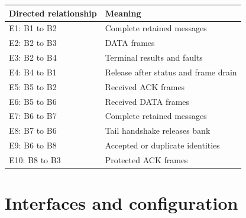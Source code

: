 \documentclass[11pt,a4paper]{article}
\begin{document}
{\small\begin{longtable}{@{}L{0.24\textwidth}L{0.7\textwidth}@{}}\toprule

\textbf{Directed relationship} & \textbf{Meaning}\\\midrule\endhead

E1: B1 to B2 & Complete retained messages\\[3pt]

E2: B2 to B3 & DATA frames\\[3pt]

E3: B2 to B4 & Terminal results and faults\\[3pt]

E4: B4 to B1 & Release after status and frame drain\\[3pt]

E5: B5 to B2 & Received ACK frames\\[3pt]

E6: B5 to B6 & Received DATA frames\\[3pt]

E7: B6 to B7 & Complete retained messages\\[3pt]

E8: B7 to B6 & Tail handshake releases bank\\[3pt]

E9: B6 to B8 & Accepted or duplicate identities\\[3pt]

E10: B8 to B3 & Protected ACK frames\\[3pt]

\bottomrule\end{longtable}}

\section{Interfaces and configuration}
\end{document}
